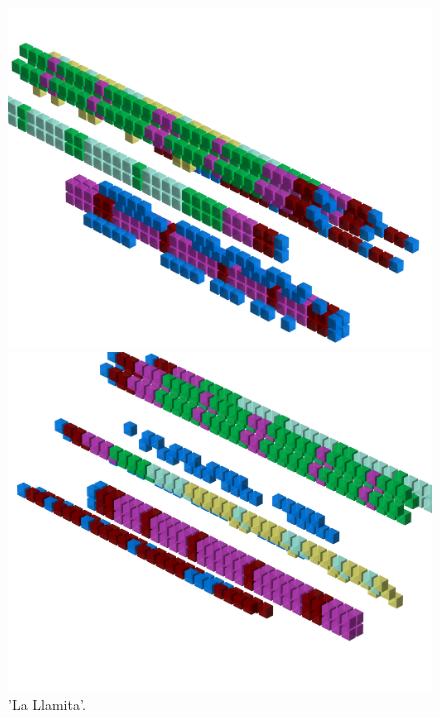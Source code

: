 \begin{figure}[H]
    \centering
    \begin{adjustbox}{width=12cm,center}
      \includegraphics[width=12cm]{src/patterns/pattern14-45.png}%
    \end{adjustbox}
    \begin{adjustbox}{width=12cm,margin=0cm -4cm}
      \includegraphics[width=12cm]{src/patterns/pattern14-225.png}%
    \end{adjustbox}
\caption{'La Llamita'.}
\end{figure}
\clearpage

